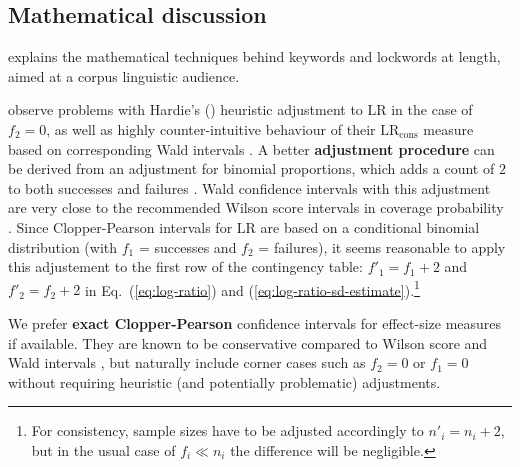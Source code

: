 \documentclass[a4paper]{article}
\newcommand{\LR}{\text{LR}}     %
\newcommand{\LRC}{\text{LR}_{\text{cons}}} %
\begin{document}
\subsection{Mathematical discussion}
\label{sec:key:math}

\citet{Hardie:14} explains the mathematical techniques behind keywords and lockwords at length, aimed at a corpus linguistic audience.

\citet{Dykes:Evert:Heinrich:21} observe problems with Hardie's (\citeyear{Hardie:14}) heuristic adjustment to $\LR$ in the case of $f_2 = 0$, as well as highly counter-intuitive behaviour of their $\LRC$ measure based on corresponding Wald intervals \citep{Evert:Dykes:Peters:18}.  A better \textbf{adjustment procedure} can be derived from an adjustment for binomial proportions, which adds a count of $2$ to both successes and failures \citep{Agresti:Coull:98}.  Wald confidence intervals with this adjustment are very close to the recommended Wilson score intervals in coverage probability \citep[123]{Agresti:Coull:98}.  Since Clopper-Pearson intervals for $\LR$ are based on a conditional binomial distribution (with $f_1$ = successes and $f_2$ = failures), it seems reasonable to apply this adjustement to the first row of the contingency table: $f'_1 = f_1 + 2$ and $f'_2 = f_2 + 2$ in Eq.~(\ref{eq:log-ratio}) and (\ref{eq:log-ratio-sd-estimate}).\footnote{For consistency, sample sizes have to be adjusted accordingly to $n'_i = n_i + 2$, but in the usual case of $f_i \ll n_i$ the difference will be negligible.}

We prefer \textbf{exact Clopper-Pearson} confidence intervals for effect-size measures if available.  They are known to be conservative compared to Wilson score and Wald intervals \citep[e.g.][]{Agresti:Coull:98}, but naturally include corner cases such as $f_2 = 0$ or $f_1 = 0$ without requiring heuristic (and potentially problematic) adjustments.
\end{document}
